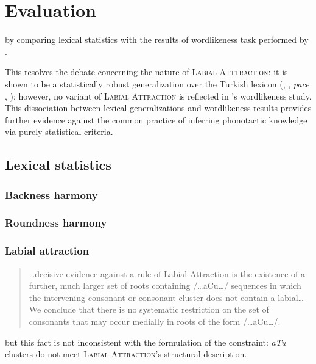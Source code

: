 \section{Evaluation}


by comparing lexical statistics with the results of wordlikeness task performed by \citet{Zimmer1969}.

This resolves the debate concerning the nature of \textsc{Labial Atttraction}: it is shown to be a statistically robust generalization over the Turkish lexicon (\citealt{Lees1966a}, \citealt{Zimmer1969}, \emph{pace} \citealt{Clements1982}, \citealt{Inkelas2001}); however, no variant of \textsc{Labial Attraction} is reflected in \citeauthor{Zimmer1969}'s wordlikeness study. This dissociation between lexical generalizations and wordlikeness results provides further evidence against the common practice of inferring phonotactic knowledge via purely statistical criteria.

\subsection{Lexical statistics}


\subsubsection{Backness harmony}
\subsubsection{Roundness harmony}
\subsubsection{Labial attraction}

\begin{quote}
\ldots{}decisive evidence against a rule of Labial Attraction is the existence of a further, much larger set of roots containing /\ldots{}aCu\ldots/ sequences in which the intervening consonant or consonant cluster does not contain a labial\ldots{}We conclude that there is no systematic restriction on the set of consonants that may occur medially in roots of the form /\ldots{}aCu\ldots/. \citep[225]{Clements1982}
\end{quote}

but this fact is not inconsistent with the formulation of the constraint:
\emph{aTu} clusters do not meet \textsc{Labial Attraction}'s structural description. 

